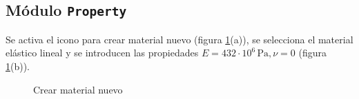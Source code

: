 \documentclass[spanish,a4paper,12pt]{article}
\begin{document}
\subsection{Módulo \texttt{Property}}

Se activa el icono para crear material nuevo (figura \ref{fig:propmat}(a)),
se selecciona el material elástico lineal y se introducen las propiedades $E=432\cdot 10^{6}\,\text{Pa}, \nu=0$
(figura \ref{fig:propmat}(b)).
\begin{figure}[h!tp]
\centering
{}
\caption{Crear material nuevo}
\label{fig:propmat}
\end{figure}
\end{document}
